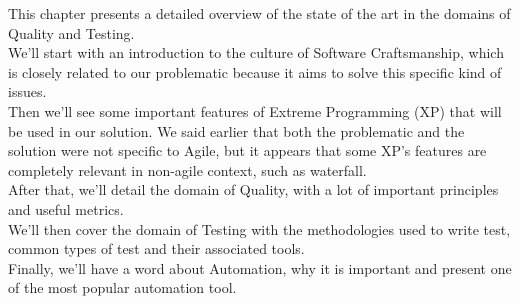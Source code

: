 This chapter presents a detailed overview of the state of the art in the
domains of Quality and Testing. \\
We'll start with an introduction to the culture of Software Craftsmanship,
which is closely related to our problematic because it aims to solve this
specific kind of issues.  \\
Then we'll see some important features of Extreme Programming (XP) that
will be used in our solution.
We said earlier that both the problematic and the solution were not
specific to Agile, but it appears that some XP's features are completely
relevant in non-agile context, such as waterfall. \\
After that, we'll detail the domain of Quality, with a lot of important
principles and useful metrics. \\
We'll then cover the domain of Testing with the methodologies used to
write test, common types of test and their associated tools. \\
Finally, we'll have a word about Automation, why it is important and
present one of the most popular automation tool.










